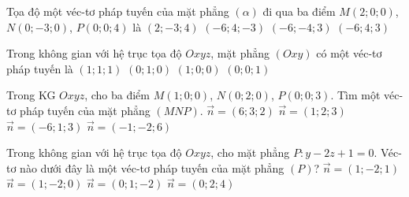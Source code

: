 \begin{ex}%
	Tọa độ một véc-tơ pháp tuyến của mặt phẳng $ (\alpha)$ đi qua ba điểm $M(2;0;0)$, $N(0;-3;0)$, $P(0;0;4)$ là     
	\choice
	{$(2;-3;4)$}
	{\True $(-6;4;-3)$}
	{$(-6;-4;3)$}
	{$(-6;4;3)$}
\end{ex}
\begin{ex}%
	Trong không gian với hệ trục tọa độ $Oxyz$, mặt phẳng $(Oxy)$ có một véc-tơ pháp tuyến là
	\choice
	{$(1;1;1)$}
	{$(0;1;0)$}
	{$(1;0;0)$}
	{\True $(0;0;1)$}
\end{ex}
\begin{ex}%
	Trong KG $Oxyz$, cho ba điểm $M(1;0;0)$, $N(0;2;0)$, $P(0;0;3)$. Tìm một véc-tơ pháp tuyến của mặt phẳng $(MNP)$.
	\choice
	{\True $\vec{n}=(6;3;2)$}
	{$\vec{n}=(1;2;3)$}
	{$\vec{n}=(-6;1;3)$}
	{$\vec{n}=(-1;-2;6)$}
\end{ex}
\begin{ex}%
	Trong không gian với hệ trục tọa độ $Oxyz$, cho mặt phẳng $P \colon y-2z+1=0$. Véc-tơ nào dưới đây là một véc-tơ pháp tuyến của mặt phẳng $(P)$?
	\choice
	{ $\vec{n}=(1;-2;1)$}
	{$ \vec{n}=(1;-2;0)$}
	{\True $  \vec{n}=(0;1;-2)$}
	{$ \vec{n}=(0;2;4)$}
\end{ex}
